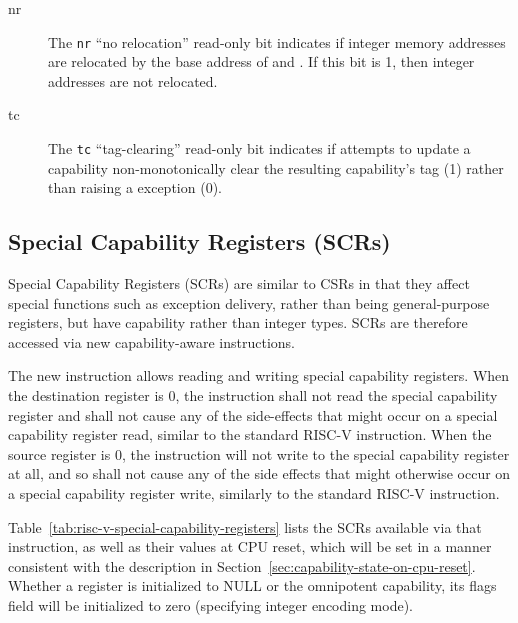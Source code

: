 \begin{description}
\item [nr] The \texttt{nr} ``no relocation'' read-only bit indicates
  if integer memory addresses are relocated by the base address of
  \DDC{} and \PCC{}.  If this bit is 1, then integer addresses are not
  relocated.
\item [tc] The \texttt{tc} ``tag-clearing'' read-only bit indicates if
  attempts to update a capability non-monotonically clear the
  resulting capability's tag (1) rather than raising a
  \riscvcheriexception{} exception (0).
\end{description}

\subsection{Special Capability Registers (SCRs)}
\label{subsection:cheri-riscv-scrs}

Special Capability Registers (SCRs) are similar to CSRs in that they affect
special functions such as exception delivery, rather than being
general-purpose registers, but have capability rather than integer types.
SCRs are therefore accessed via new capability-aware instructions.

The new  instruction allows reading and writing special
capability registers. When the destination register is 0, the instruction shall
not read the special capability register and shall not cause any of the
side-effects that might occur on a special capability register read, similar to
the standard  RISC-V instruction. When the source register is 0, the
instruction will not write to the special capability register at all, and so
shall not cause any of the side effects that might otherwise occur on a special
capability register write, similarly to the standard  RISC-V
instruction.

Table~\ref{tab:risc-v-special-capability-registers} lists the SCRs
available via that instruction, as well as their values at CPU reset, which
will be set in a manner consistent with the description in
Section~\ref{sec:capability-state-on-cpu-reset}.
Whether a register is initialized to NULL or the omnipotent capability, its
flags field will be initialized to zero (specifying integer encoding mode).


